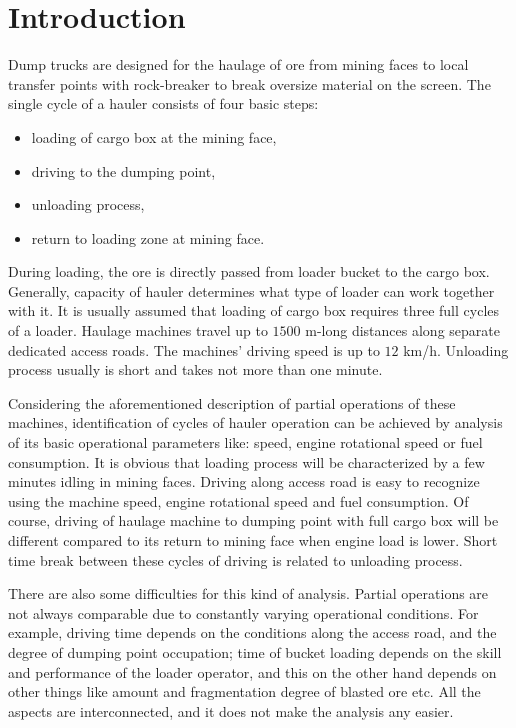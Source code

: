 \section{Introduction}
Dump trucks are designed for the haulage of ore from mining faces to local transfer points with rock-breaker to break oversize material on the screen. The single cycle of a hauler consists of four basic steps: 
\begin{itemize}
\renewcommand{\labelitemi}{$\bullet$}
\item loading of cargo box at the mining face,
\item driving to the dumping point,
\item unloading process,
\item return to loading zone at mining face.
\end{itemize}
During loading, the ore is directly passed from loader bucket to the cargo box. Generally, capacity of hauler determines what type of loader can work together with it. It is usually assumed that loading of cargo box requires three full cycles of a loader. Haulage machines travel up to $1500$ m-long distances along separate dedicated access roads. The machines' driving speed is up to $12$ km/h. Unloading process usually is short and takes not more than one minute. \par
Considering the aforementioned description of partial operations of these machines, identification of cycles of hauler operation can be achieved by analysis of its basic operational parameters like: speed, engine rotational speed or fuel consumption. It is obvious that loading process will be characterized by a few minutes idling in mining faces. Driving along access road is easy to recognize using the machine speed, engine rotational speed and fuel consumption. Of course, driving of haulage machine to dumping point with full cargo box will be different compared to its return to mining face when engine load is lower. Short time break between these cycles of driving is related to unloading process. \par
There are also some difficulties for this kind of analysis. Partial operations are not always comparable due to constantly varying operational conditions. For example, driving time depends on the conditions along the access road, and the degree of dumping point occupation; time of bucket loading depends on the skill and performance of the loader operator, and this on the other hand depends on other things like amount and fragmentation degree of blasted ore etc. All the aspects are interconnected, and it does not make the analysis any easier.
